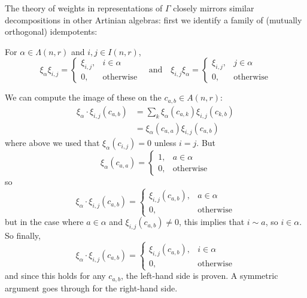 \documentclass[12pt]{article}
\begin{document}
The theory of weights in representations of $\Gamma$ closely mirrors similar decompositions in other 
Artinian algebras: first we identify a family of (mutually orthogonal) idempotents:
\begin{lem}
	For $\alpha\in\Lambda(n,r)$ and $i,j\in I(n,r)$,
	\[\xi_\alpha\xi_{i,j}=\begin{cases}
		\xi_{i,j}, & i\in\alpha\\
		0, &\text{otherwise}
	\end{cases}\quad\text{and}\quad\xi_{i,j}\xi_\alpha=\begin{cases}
		\xi_{i,j}, & j\in\alpha\\
		0, &\text{otherwise}
	\end{cases}\]
\end{lem}
\begin{prf}
	We can compute the image of these on the $c_{a,b}\in A(n,r)$:
	\begin{align*}
		\xi_\alpha\cdot \xi_{i,j}(c_{a,b})&=\sum_k \xi_\alpha(c_{a,k})\xi_{i,j}(c_{k,b})\\
		&= \xi_\alpha(c_{a,a})\xi_{i,j}(c_{a,b})
	\end{align*}
	where above we used that $\xi_{\alpha}(c_{i,j})=0$ unless $i=j$. But 
	\[\xi_\alpha(c_{a,a})=\begin{cases}
		1, & a\in\alpha\\ 0, & \text{otherwise}
	\end{cases}\]
	so 
	\[\xi_\alpha\cdot \xi_{i,j}(c_{a,b})=\begin{cases}
		\xi_{i,j}(c_{a,b}),& a\in\alpha\\ 0,& \text{otherwise}
	\end{cases}\]
	but in the case where $a\in\alpha$ and $\xi_{i,j}(c_{a,b})\ne 0$, this implies that $i\sim a$, so $i\in \alpha$. So finally,
	\[\xi_\alpha\cdot \xi_{i,j}(c_{a,b})=\begin{cases}
		\xi_{i,j}(c_{a,b}),& i\in\alpha\\ 0,& \text{otherwise}
	\end{cases}\]
	and since this holds for any $c_{a,b}$, the left-hand side is proven. A symmetric argument goes through for the right-hand side.
\end{prf}
\end{document}
